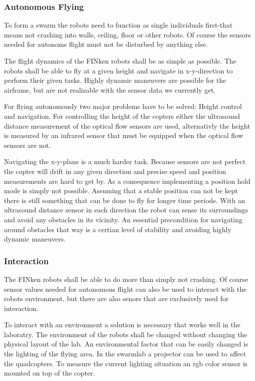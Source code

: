 \subsubsection{Autonomous Flying}
To form a swarm the robots need to function as single individuals first-that means not crashing into walls, ceiling, floor or other robots.
Of course the sensors needed for autonoms flight must not be disturbed by anything else. 

The flight dynamics of the FINken robots shall be as simple as possible.
The robots shall be able to fly at a given height and navigate in x-y-direction to perform their given tasks.
Highly dynamic maneuvers are possible for the airframe, but are not realizable with the sensor data we currently get. 

For flying autonomously two major problems have to be solved: Height control and navigation.
For controlling the height of the copters either the ultrasound distance measurement of the optical flow sensors are used, alternativly the height is measured by an infrared sensor that must be equipped when the optical flow sensors are not.

Navigating the x-y-plane is a much harder task.
Because sensors are not perfect the copter will drift in any given direction and precise speed and position measurements are hard to get by.
As a consequence implementing a position hold mode is simply not possible.
Assuming that a stable position can not be kept there is still something that can be done to fly for longer time periods.
With an ultrasound distance sensor in each direction the robot can sense its surroundings and avoid any obstacles in its vicinity.
An essential precondition for navigating around obstacles that way is a certian level of stability and avoiding highly dynamic maneuvers.

\subsubsection{Interaction}

The FINken robots shall be able to do more than simply not crashing.
Of course sensor values needed for autonomous flight can also be used to interact with the robots environment, but there are also senors that are exclusively used for interaction.

To interact with an environment a solution is necessary that works well in the laboratry.
The environment of the robots shall be changed without changing the physical layout of the lab.
An environmental factor that can be easily changed is the lighting of the flying area.
In the swarmlab a projector can be used to affect the quadcopters.
To measure the current lighting situation an rgb color sensor is mounted on top of the copter.

